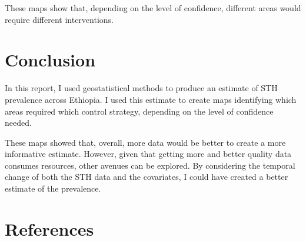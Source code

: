 \documentclass[
]{article}
\begin{document}
These maps show that, depending on the level of confidence, different
areas would require different interventions.

\hypertarget{conclusion}{%
\section{Conclusion}\label{conclusion}}

In this report, I used geostatistical methods to produce an estimate of
STH prevalence across Ethiopia. I used this estimate to create maps
identifying which areas required which control strategy, depending on
the level of confidence needed.

These maps showed that, overall, more data would be better to create a
more informative estimate. However, given that getting more and better
quality data consumes resources, other avenues can be explored. By
considering the temporal change of both the STH data and the covariates,
I could have created a better estimate of the prevalence.

\newpage

\hypertarget{references}{%
\section*{References}\label{references}}
\end{document}
